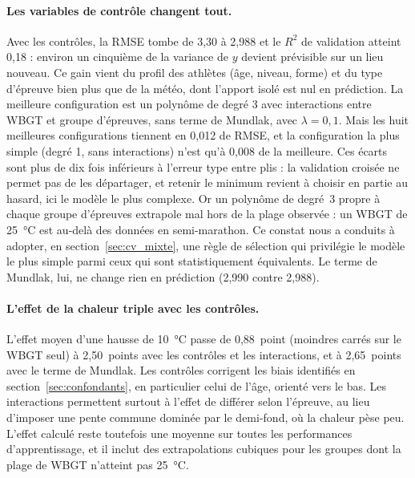 \documentclass[11pt,a4paper]{article}
\begin{document}
\paragraph{Les variables de contrôle changent tout.} Avec les contrôles, la RMSE tombe de 3,30 à 2,988 et le $R^2$ de
validation atteint 0,18 : environ un cinquième de la variance de $y$ devient prévisible sur un lieu nouveau. Ce gain
vient du profil des athlètes (âge, niveau, forme) et du type d'épreuve bien plus que de la météo, dont l'apport isolé
est nul en prédiction. La meilleure configuration est un polynôme de degré 3 avec interactions entre WBGT et groupe
d'épreuves, sans terme de Mundlak, avec $\lambda = 0{,}1$. Mais les huit meilleures configurations tiennent en 0,012
de RMSE, et la configuration la plus simple (degré 1, sans interactions) n'est qu'à 0,008 de la meilleure. Ces écarts
sont plus de dix fois inférieurs à l'erreur type entre plis : la validation croisée ne permet pas de les départager,
et retenir le minimum revient à choisir en partie au hasard, ici le modèle le plus complexe. Or un polynôme de degré~3
propre à chaque groupe d'épreuves extrapole mal hors de la plage observée : un WBGT de 25~°C est au-delà des données en
semi-marathon. Ce constat nous a conduits à adopter, en section~\ref{sec:cv_mixte}, une règle de sélection qui
privilégie le modèle le plus simple parmi ceux qui sont statistiquement équivalents. Le terme de Mundlak, lui, ne
change rien en prédiction (2,990 contre 2,988).

\paragraph{L'effet de la chaleur triple avec les contrôles.} L'effet moyen d'une hausse de 10~°C passe de 0,88~point
(moindres carrés sur le WBGT seul) à 2,50~points avec les contrôles et les interactions, et à 2,65~points avec le terme
de Mundlak. Les contrôles corrigent les biais identifiés en section~\ref{sec:confondants}, en particulier celui de
l'âge, orienté vers le bas. Les interactions permettent surtout à l'effet de différer selon l'épreuve, au lieu
d'imposer une pente commune dominée par le demi-fond, où la chaleur pèse peu. L'effet calculé reste toutefois une
moyenne sur toutes les performances d'apprentissage, et il inclut des extrapolations cubiques pour les groupes dont la
plage de WBGT n'atteint pas 25~°C.
\end{document}
